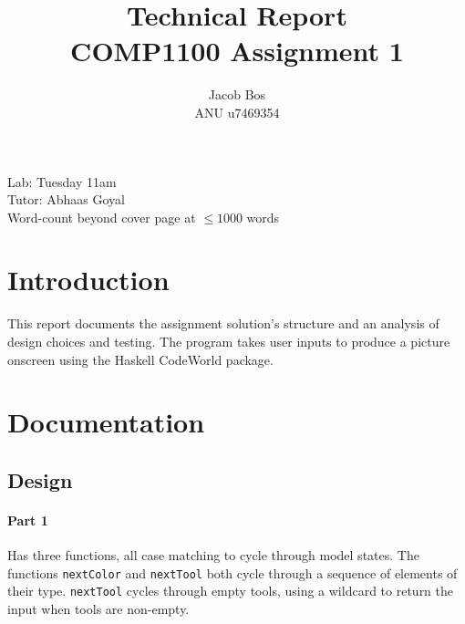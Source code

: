 \documentclass[11pt]{article}
\title{Technical Report\\ COMP1100 Assignment 1}
\author{Jacob Bos\\ ANU u7469354}
\begin{document}
\maketitle
{}
\begin{center}
  Lab: Tuesday 11am\\
  Tutor: Abhaas Goyal\\
  Word-count beyond cover page at $\leq 1000$ words
\end{center}
\tableofcontents
\newpage
{}
\section*{Introduction} 
This report documents the assignment solution's structure and an analysis of design choices and testing. The program takes user inputs to produce a picture onscreen using the Haskell CodeWorld package. %


\section{Documentation}%
\subsection{Design}
\paragraph{Part 1} Has three functions, all case matching to cycle through model states. The functions \verb|nextColor| and  \verb|nextTool| both cycle through a sequence of elements of their type.  \verb|nextTool| cycles through empty tools, using a wildcard to return the input when tools are non-empty. %
\end{document}
